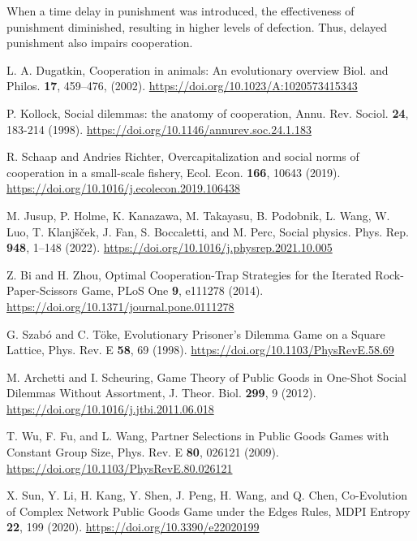 When a time delay in punishment was introduced, the effectiveness of punishment diminished, resulting in higher levels of defection. Thus, delayed punishment also impairs cooperation. 





\begin{thebibliography}{04}

L. A. Dugatkin,
Cooperation in animals: An evolutionary overview
Biol. and Philos. \textbf{17}, 459–476, (2002).
\url{https://doi.org/10.1023/A:1020573415343}

P. Kollock, Social dilemmas: the anatomy of cooperation,
Annu. Rev. Sociol. \textbf{24}, 183-214 (1998).
\url{https://doi.org/10.1146/annurev.soc.24.1.183}

R. Schaap and Andries Richter,
Overcapitalization and social norms of cooperation in a small-scale fishery,
Ecol. Econ. \textbf{166}, 10643 (2019).
\url{https://doi.org/10.1016/j.ecolecon.2019.106438}

\raggedright
M. Jusup, P. Holme, K. Kanazawa,  M. Takayasu, B. Podobnik, L. Wang,  W. Luo, T. Klanjšček, J. Fan,  S. Boccaletti, and M. Perc,
Social physics.
Phys. Rep. \textbf{948}, 1--148 (2022). 
\url{https://doi.org/10.1016/j.physrep.2021.10.005}

Z. Bi and H. Zhou, Optimal Cooperation-Trap Strategies for the Iterated Rock-Paper-Scissors Game, PLoS One \textbf{9}, e111278 (2014). \url{https://doi.org/10.1371/journal.pone.0111278}

G. Szabó and C. Töke, Evolutionary Prisoner’s Dilemma Game on a Square Lattice, Phys. Rev. E \textbf{58}, 69 (1998). \url{https://doi.org/10.1103/PhysRevE.58.69}

M. Archetti and I. Scheuring, Game Theory of Public Goods in One-Shot Social Dilemmas Without Assortment, J. Theor. Biol. \textbf{299}, 9 (2012). \url{https://doi.org/10.1016/j.jtbi.2011.06.018}

T. Wu, F. Fu, and L. Wang, Partner Selections in Public Goods Games with Constant Group Size, Phys. Rev. E \textbf{80}, 026121 (2009). \url{https://doi.org/10.1103/PhysRevE.80.026121}

X. Sun, Y. Li, H. Kang, Y. Shen, J. Peng, H. Wang, and Q. Chen, Co-Evolution of Complex Network Public Goods Game under the Edges Rules, MDPI Entropy \textbf{22}, 199 (2020). \url{https://doi.org/10.3390/e22020199}







\end{thebibliography}
